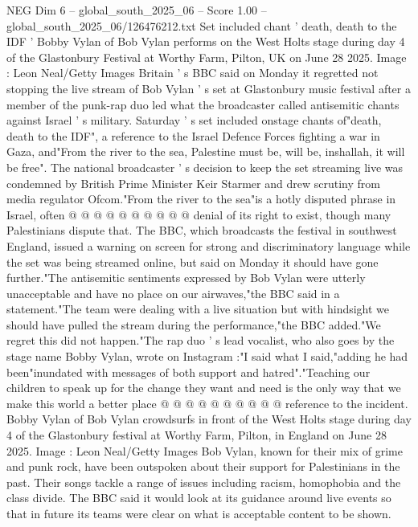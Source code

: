 \begin{textsample}{NEG Dim 6 – global\_south\_2025\_06 – Score 1.00 – global\_south\_2025\_06/126476212.txt}  \label{ex:f6_neg_445}
Set included chant ' death, death to the IDF ' Bobby Vylan of Bob Vylan performs on the West Holts stage during day 4 of the Glastonbury Festival at Worthy Farm, Pilton, UK on June 28 2025.
Image : Leon Neal/Getty Images Britain ' s BBC said on Monday it regretted not stopping the live stream of Bob Vylan ' s set at Glastonbury music festival after a member of the punk-rap duo led what the broadcaster called antisemitic chants against Israel ' s military.
Saturday ' s set included onstage chants of"death, death to the IDF", a reference to the Israel Defence Forces fighting a war in Gaza, and"From the river to the sea, Palestine must be, will be, inshallah, it will be free".
The national broadcaster ' s decision to keep the set streaming live was condemned by British Prime Minister Keir Starmer and drew scrutiny from media regulator Ofcom."From the river to the sea"is a hotly disputed phrase in Israel, often @ @ @ @ @ @ @ @ @ @ denial of its right to exist, though many Palestinians dispute that.
The BBC, which broadcasts the festival in southwest England, issued a warning on screen for strong and discriminatory language while the set was being streamed online, but said on Monday it should have gone further."The antisemitic sentiments expressed by Bob Vylan were utterly unacceptable and have no place on our airwaves,"the BBC said in a statement."The team were dealing with a live situation but with hindsight we should have pulled the stream during the performance,"the BBC added."We regret this did not happen."The rap duo ' s lead vocalist, who also goes by the stage name Bobby Vylan, wrote on Instagram :"I said what I said,"adding he had been"inundated with messages of both support and hatred"."Teaching our children to speak up for the change they want and need is the only way that we make this world a better place @ @ @ @ @ @ @ @ @ @ reference to the incident.
Bobby Vylan of Bob Vylan crowdsurfs in front of the West Holts stage during day 4 of the Glastonbury festival at Worthy Farm, Pilton, in England on June 28 2025.
Image : Leon Neal/Getty Images Bob Vylan, known for their mix of grime and punk rock, have been outspoken about their support for Palestinians in the past.
Their songs tackle a range of issues including racism, homophobia and the class divide.
The BBC said it would look at its guidance around live events so that in future its teams were clear on what is acceptable content to be shown.

\end{textsample}
